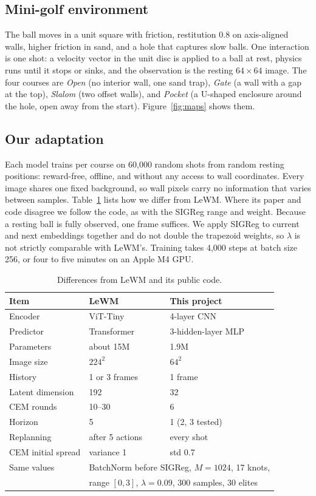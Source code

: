 \documentclass[10pt,twocolumn]{article}
\begin{document}
\subsection{Mini-golf environment}
The ball moves in a unit square with friction, restitution 0.8 on axis-aligned walls, higher friction in sand, and a hole that captures slow balls. One interaction is one shot: a velocity vector in the unit disc is applied to a ball at rest, physics runs until it stops or sinks, and the observation is the resting $64\times64$ image. The four courses are \emph{Open} (no interior wall, one sand trap), \emph{Gate} (a wall with a gap at the top), \emph{Slalom} (two offset walls), and \emph{Pocket} (a U-shaped enclosure around the hole, open away from the start). Figure~\ref{fig:maps} shows them.

\subsection{Our adaptation}
Each model trains per course on 60,000 random shots from random resting positions: reward-free, offline, and without any access to wall coordinates. Every image shares one fixed background, so wall pixels carry no information that varies between samples. Table~\ref{tab:deviations} lists how we differ from LeWM. Where its paper and code disagree we follow the code, as with the SIGReg range and weight. Because a resting ball is fully observed, one frame suffices. We apply SIGReg to current and next embeddings together and do not double the trapezoid weights, so $\lambda$ is not strictly comparable with LeWM's. Training takes 4,000 steps at batch size 256, or four to five minutes on an Apple M4 GPU.

\begin{table}[t]
\centering\footnotesize
\begin{tabular}{@{}lll@{}}
\toprule
Item & LeWM & This project\\
\midrule
Encoder & ViT-Tiny & 4-layer CNN\\
Predictor & Transformer & 3-hidden-layer MLP\\
Parameters & about 15M & 1.9M\\
Image size & $224^2$ & $64^2$\\
History & 1 or 3 frames & 1 frame\\
Latent dimension & 192 & 32\\
CEM rounds & 10--30 & 6\\
Horizon & 5 & 1 (2, 3 tested)\\
Replanning & after 5 actions & every shot\\
CEM initial spread & variance 1 & std 0.7\\
Same values & \multicolumn{2}{l}{BatchNorm before SIGReg, $M{=}1024$, 17 knots,}\\
 & \multicolumn{2}{l}{range $[0,3]$, $\lambda{=}0.09$, 300 samples, 30 elites}\\
\bottomrule
\end{tabular}
\caption{Differences from LeWM \cite{maes2026lewm} and its public code.}
\label{tab:deviations}
\end{table}
\end{document}
